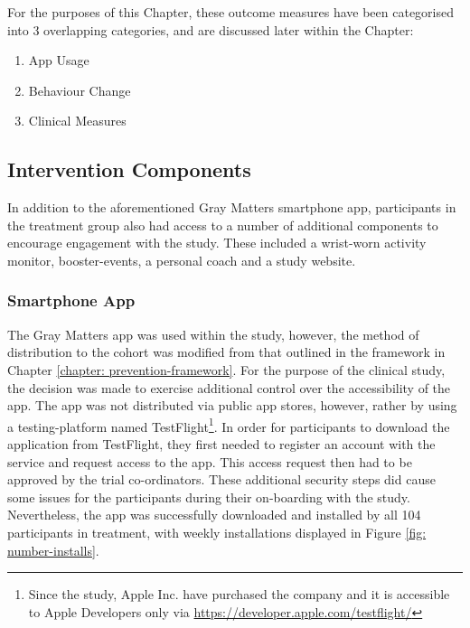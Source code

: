 For the purposes of this Chapter, these outcome measures have been categorised into 3 overlapping categories, and are discussed later within the Chapter:
\begin{enumerate}[noitemsep,topsep=0pt]
	\item App Usage
	\item Behaviour Change
	\item Clinical Measures
\end{enumerate}

\subsection{Intervention Components}
In addition to the aforementioned Gray Matters smartphone app, participants in the treatment group also had access to a number of additional components to encourage engagement with the study. These included a wrist-worn activity monitor, booster-events, a personal coach and a study website.

\subsubsection{Smartphone App}
The Gray Matters app was used within the study, however, the method of distribution to the cohort was modified from that outlined in the framework in Chapter \ref{chapter: prevention-framework}. For the purpose of the clinical study, the decision was made to exercise additional control over the accessibility of the app. The app was not distributed via public app stores, however, rather by using a testing-platform named TestFlight\footnote{Since the study, Apple Inc. have purchased the company and it is accessible to Apple Developers only via \url{https://developer.apple.com/testflight/}}. In order for participants to download the application from TestFlight, they first needed to register an account with the service and request access to the app. This access request then had to be approved by the trial co-ordinators. These additional security steps did cause some issues for the participants during their on-boarding with the study. Nevertheless, the app was successfully downloaded and installed by all 104 participants in treatment, with weekly installations displayed in Figure \ref{fig: number-installs}.

